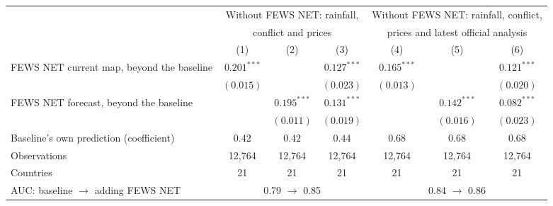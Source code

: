 \begin{tabular}{lcccccc}
\toprule
 & \multicolumn{3}{c}{Without FEWS NET: rainfall,} & \multicolumn{3}{c}{Without FEWS NET: rainfall, conflict,} \\
 & \multicolumn{3}{c}{conflict and prices} & \multicolumn{3}{c}{prices and latest official analysis} \\
\cmidrule(lr){2-4}\cmidrule(lr){5-7}
 & (1) & (2) & (3) & (4) & (5) & (6) \\
\midrule
FEWS NET current map, beyond the baseline & $0.201^{***}$ &  & $0.127^{***}$ & $0.165^{***}$ &  & $0.121^{***}$ \\
 & $(0.015)$ &  & $(0.023)$ & $(0.013)$ &  & $(0.020)$ \\
FEWS NET forecast, beyond the baseline &  & $0.195^{***}$ & $0.131^{***}$ &  & $0.142^{***}$ & $0.082^{***}$ \\
 &  & $(0.011)$ & $(0.019)$ &  & $(0.016)$ & $(0.023)$ \\
Baseline's own prediction (coefficient) & $0.42$ & $0.42$ & $0.44$ & $0.68$ & $0.68$ & $0.68$ \\
\midrule
Observations & 12,764 & 12,764 & 12,764 & 12,764 & 12,764 & 12,764 \\
Countries & 21 & 21 & 21 & 21 & 21 & 21 \\
AUC: baseline $\rightarrow$ adding FEWS NET & \multicolumn{3}{c}{0.79 $\rightarrow$ 0.85} & \multicolumn{3}{c}{0.84 $\rightarrow$ 0.86} \\
\bottomrule
\end{tabular}